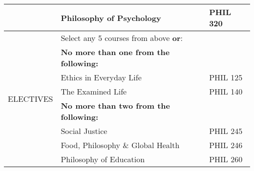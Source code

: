 \documentclass[oneside, 11pt]{article}
\begin{document}
\begin{center}
\begin{tabular}{ |l|l|l| }
   & Philosophy of Psychology & PHIL 320 \\ \hline
 \multirow{8}{*}{ELECTIVES} & Select any 5 courses from above \textbf{or}: &  \\
 & \textbf{No more than one from the following:} & \\
&  Ethics in Everyday Life & PHIL 125 \\
& The Examined Life & PHIL 140 \\
& \textbf{No more than two from the following:} &  \\
  & Social Justice & PHIL 245 \\
 & Food, Philosophy \& Global Health & PHIL 246 \\
  & Philosophy of Education & PHIL 260 \\
\hline
\end{tabular}
\end{center}
\end{document}
